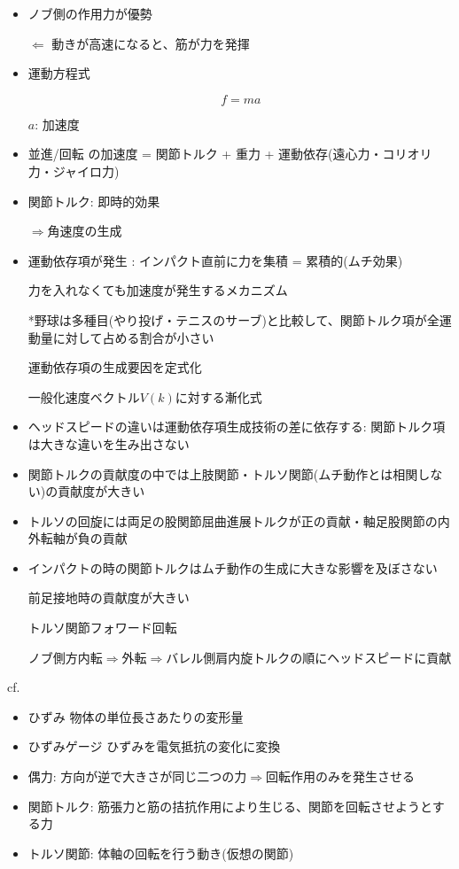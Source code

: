 \documentclass[dvipdfmx, 10.5pt]{jsarticle}
\begin{document}
\begin{itemize}
  \item ノブ側の作用力が優勢

  $\Leftarrow$ 動きが高速になると、筋が力を発揮

  \item 運動方程式

  \[
  f = ma
  \]

  $a$: 加速度

  \item 並進/回転 の加速度 = 関節トルク + 重力 + 運動依存(遠心力・コリオリ力・ジャイロ力)

  \item 関節トルク: 即時的効果

  $\Rightarrow$角速度の生成

  \item 運動依存項が発生 : インパクト直前に力を集積 = 累積的(ムチ効果)

  力を入れなくても加速度が発生するメカニズム

  *野球は多種目(やり投げ・テニスのサーブ)と比較して、関節トルク項が全運動量に対して占める割合が小さい

  運動依存項の生成要因を定式化

  一般化速度ベクトル$V(k)$に対する漸化式

  \item ヘッドスピードの違いは運動依存項生成技術の差に依存する: 関節トルク項は大きな違いを生み出さない

  \item 関節トルクの貢献度の中では上肢関節・トルソ関節(ムチ動作とは相関しない)の貢献度が大きい

  \item トルソの回旋には両足の股関節屈曲進展トルクが正の貢献・軸足股関節の内外転軸が負の貢献

  \item インパクトの時の関節トルクはムチ動作の生成に大きな影響を及ぼさない

  前足接地時の貢献度が大きい

  トルソ関節フォワード回転

  ノブ側方内転$\Rightarrow$外転$\Rightarrow$バレル側肩内旋トルクの順にヘッドスピードに貢献

\end{itemize}

cf.
\begin{itemize}
  \small

  \item ひずみ 物体の単位長さあたりの変形量

  \item ひずみゲージ ひずみを電気抵抗の変化に変換

  \item 偶力: 方向が逆で大きさが同じ二つの力$\Rightarrow$回転作用のみを発生させる

  \item 関節トルク: 筋張力と筋の拮抗作用により生じる、関節を回転させようとする力

  \item トルソ関節: 体軸の回転を行う動き(仮想の関節)
\end{itemize}
\end{document}

